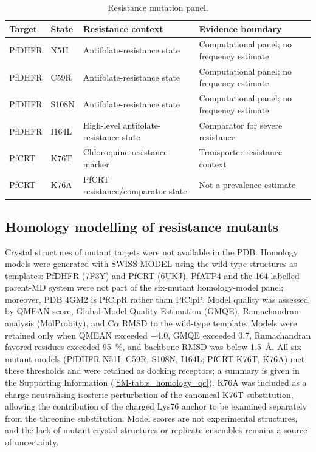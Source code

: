 \documentclass[journal=jcisd8,manuscript=article,layout=traditional]{achemso}
\begin{document}
\begin{table}[htbp]
\centering
\caption{Resistance mutation panel.}
\label{tab:mutations}
\begin{tabularx}{\textwidth}{l l l X}
\toprule
Target & State & Resistance context & Evidence boundary \\
\midrule
PfDHFR & N51I & Antifolate-resistance state & Computational panel; no frequency estimate \\
PfDHFR & C59R & Antifolate-resistance state & Computational panel; no frequency estimate \\
PfDHFR & S108N & Antifolate-resistance state & Computational panel; no frequency estimate \\
PfDHFR & I164L & High-level antifolate-resistance state & Comparator for severe resistance \\
PfCRT & K76T & Chloroquine-resistance marker & Transporter-resistance context \\
PfCRT & K76A & PfCRT resistance/comparator state & Not a prevalence estimate \\
\bottomrule
\end{tabularx}
\end{table}

\subsection{Homology modelling of resistance mutants}

Crystal structures of mutant targets were not available in the PDB. Homology models were generated with SWISS-MODEL using the wild-type structures as templates: PfDHFR (7F3Y) and PfCRT (6UKJ). PfATP4 and the 164-labelled parent-MD system were not part of the six-mutant homology-model panel; moreover, PDB 4GM2 is PfClpR rather than PfClpP. Model quality was assessed by QMEAN score, Global Model Quality Estimation (GMQE), Ramachandran analysis (MolProbity), and C$\alpha$ RMSD to the wild-type template. Models were retained only when QMEAN exceeded \num{-4.0}, GMQE exceeded \num{0.7}, Ramachandran favored residues exceeded \qty{95}{\percent}, and backbone RMSD was below \qty{1.5}{\angstrom}. All six mutant models (PfDHFR N51I, C59R, S108N, I164L; PfCRT K76T, K76A) met these thresholds and were retained as docking receptors; a summary is given in the Supporting Information (\cref{SM-tab:s_homology_qc}). K76A was included as a charge-neutralising isosteric perturbation of the canonical K76T substitution, allowing the contribution of the charged Lys76 anchor to be examined separately from the threonine substitution. Model scores are not experimental structures, and the lack of mutant crystal structures or replicate ensembles remains a source of uncertainty.
\end{document}
